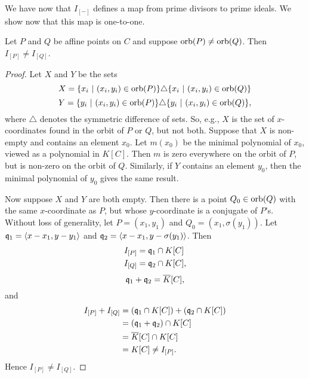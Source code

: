 We have now that $I_{[-]}$ defines a map from prime divisors to prime ideals.
We show now that this map is one-to-one.
\begin{proposition}
  Let $P$ and $Q$ be affine points on $C$ and suppose $\orb(P) \neq \orb(Q)$.
  Then $I_{[P]} \neq I_{[Q]}$.
\end{proposition}
\begin{proof}
  Let $X$ and $Y$ be the sets
    \[ X = \{ x_i ~|~ (x_i, y_i) \in \orb(P) \} \triangle \{ x_i ~|~ (x_i, y_i) \in \orb(Q) \} \]
    \[ Y = \{ y_i ~|~ (x_i, y_i) \in \orb(P) \} \triangle \{ y_i ~|~ (x_i, y_i) \in \orb(Q) \}, \]
    where $\triangle$ denotes the symmetric difference of sets.
  So, e.g., $X$ is the set of $x$-coordinates found in the orbit of $P$ or $Q$, but not both.
  Suppose that $X$ is non-empty and contains an element $x_0$.
  Let $m(x_0)$ be the minimal polynomial of $x_0$, viewed as a polynomial in $K[C]$.
  Then $m$ is zero everywhere on the orbit of $P$, but is non-zero on the orbit of $Q$.
  Similarly, if $Y$ contains an element $y_0$, then the minimal polynomial of $y_0$ gives the same result.

  Now suppose $X$ and $Y$ are both empty.
  Then there is a point $Q_0 \in \orb(Q)$ with the same $x$-coordinate as $P$, but whose $y$-coordinate is a conjugate of $P$'s.
  Without loss of generality, let $P = (x_1, y_1)$ and $Q_0 = (x_1, \sigma(y_1))$.
  Let $\frak q_1 = \pid{x - x_1, y - y_1}$ and $\frak q_2 = \pid{x - x_1, y - \sigma(y_1)}$. Then
  \begin{align*}
    I_{[P]} &= \frak q_1 \cap K[C] \\
    I_{[Q]} &= \frak q_2 \cap K[C],
  \end{align*}
  \[ \frak q_1 + \frak q_2 = \bar K[C], \]
  and
  \begin{align*}
    I_{[P]} + I_{[Q]}
      &= (\frak q_1 \cap K[C]) + (\frak q_2 \cap K[C]) \\
      &= (\frak q_1  + \frak q_2) \cap K[C] \\
      &= \bar K[C] \cap K[C] \\
      &= K[C] \neq I_{[P]}.
  \end{align*}
  Hence $I_{[P]} \neq I_{[Q]}$.
\end{proof}

